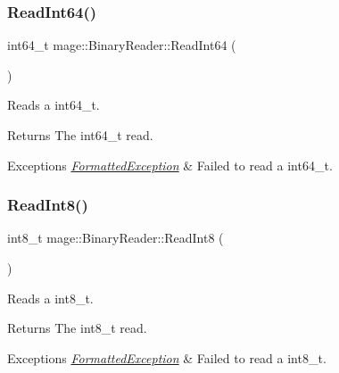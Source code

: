 \subsubsection{\texorpdfstring{Read\+Int64()}{ReadInt64()}}
{\footnotesize\ttfamily int64\+\_\+t mage\+::\+Binary\+Reader\+::\+Read\+Int64 (\begin{DoxyParamCaption}{ }\end{DoxyParamCaption})\hspace{0.3cm}{\ttfamily [protected]}}

Reads a {\ttfamily int64\+\_\+t}.

\begin{DoxyReturn}{Returns}
The {\ttfamily int64\+\_\+t} read. 
\end{DoxyReturn}

\begin{DoxyExceptions}{Exceptions}
{\em \hyperlink{structmage_1_1_formatted_exception}{Formatted\+Exception}} & Failed to read a {\ttfamily int64\+\_\+t}. \\
\hline
\end{DoxyExceptions}
\hypertarget{classmage_1_1_binary_reader_abfc9296a42190b21ad0ddb6e0ea119af}{}\label{classmage_1_1_binary_reader_abfc9296a42190b21ad0ddb6e0ea119af} 
\subsubsection{\texorpdfstring{Read\+Int8()}{ReadInt8()}}
{\footnotesize\ttfamily int8\+\_\+t mage\+::\+Binary\+Reader\+::\+Read\+Int8 (\begin{DoxyParamCaption}{ }\end{DoxyParamCaption})\hspace{0.3cm}{\ttfamily [protected]}}

Reads a {\ttfamily int8\+\_\+t}.

\begin{DoxyReturn}{Returns}
The {\ttfamily int8\+\_\+t} read. 
\end{DoxyReturn}

\begin{DoxyExceptions}{Exceptions}
{\em \hyperlink{structmage_1_1_formatted_exception}{Formatted\+Exception}} & Failed to read a {\ttfamily int8\+\_\+t}. \\
\hline
\end{DoxyExceptions}
\hypertarget{classmage_1_1_binary_reader_ad93616adef47e0256f117b8a6f8ba8bb}{}\label{classmage_1_1_binary_reader_ad93616adef47e0256f117b8a6f8ba8bb} 
